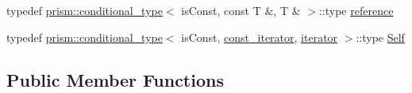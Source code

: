 \begin{DoxyCompactItemize}
\item 
typedef \hyperlink{structprism_1_1conditional__type}{prism\+::conditional\+\_\+type}$<$ is\+Const, const T \&, T \& $>$\+::type \hyperlink{structprism_1_1_sequence_iterator_ac93bc1c2e901ea09aba9c3af33da21ba}{reference}
\item 
typedef \hyperlink{structprism_1_1conditional__type}{prism\+::conditional\+\_\+type}$<$ is\+Const, \hyperlink{structprism_1_1_sequence_iterator_a8be80243dfbbc36132e108a7858eafd0}{const\+\_\+iterator}, \hyperlink{structprism_1_1_sequence_iterator_ac791d493ea5fafcc435a83dbe2385a1e}{iterator} $>$\+::type \hyperlink{structprism_1_1_sequence_iterator_ab79c94ff5b3328808b659f19d6bc0301}{Self}
\end{DoxyCompactItemize}
\subsection*{Public Member Functions}
